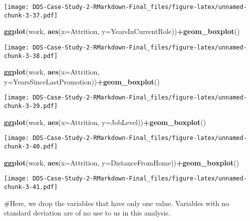 \documentclass[]{article}
\newenvironment{Shaded}{\begin{snugshade}}{\end{snugshade}}
\newcommand{\DataTypeTok}[1]{\textcolor[rgb]{0.13,0.29,0.53}{#1}}
\newcommand{\KeywordTok}[1]{\textcolor[rgb]{0.13,0.29,0.53}{\textbf{#1}}}
\newcommand{\NormalTok}[1]{#1}
\newcommand{\OperatorTok}[1]{\textcolor[rgb]{0.81,0.36,0.00}{\textbf{#1}}}
\begin{document}
\texttt{[image: DDS-Case-Study-2-RMarkdown-Final\_files/figure-latex/unnamed-chunk-3-37.pdf]}

\begin{Shaded}
\begin{Highlighting}[]
\KeywordTok{ggplot}\NormalTok{(work, }\KeywordTok{aes}\NormalTok{(}\DataTypeTok{x=}\NormalTok{Attrition, }\DataTypeTok{y=}\NormalTok{YearsInCurrentRole))}\OperatorTok{+}\KeywordTok{geom_boxplot}\NormalTok{()}
\end{Highlighting}
\end{Shaded}

\texttt{[image: DDS-Case-Study-2-RMarkdown-Final\_files/figure-latex/unnamed-chunk-3-38.pdf]}

\begin{Shaded}
\begin{Highlighting}[]
\KeywordTok{ggplot}\NormalTok{(work, }\KeywordTok{aes}\NormalTok{(}\DataTypeTok{x=}\NormalTok{Attrition, }\DataTypeTok{y=}\NormalTok{YearsSinceLastPromotion))}\OperatorTok{+}\KeywordTok{geom_boxplot}\NormalTok{()}
\end{Highlighting}
\end{Shaded}

\texttt{[image: DDS-Case-Study-2-RMarkdown-Final\_files/figure-latex/unnamed-chunk-3-39.pdf]}

\begin{Shaded}
\begin{Highlighting}[]
\KeywordTok{ggplot}\NormalTok{(work, }\KeywordTok{aes}\NormalTok{(}\DataTypeTok{x=}\NormalTok{Attrition, }\DataTypeTok{y=}\NormalTok{JobLevel))}\OperatorTok{+}\KeywordTok{geom_boxplot}\NormalTok{()}
\end{Highlighting}
\end{Shaded}

\texttt{[image: DDS-Case-Study-2-RMarkdown-Final\_files/figure-latex/unnamed-chunk-3-40.pdf]}

\begin{Shaded}
\begin{Highlighting}[]
\KeywordTok{ggplot}\NormalTok{(work, }\KeywordTok{aes}\NormalTok{(}\DataTypeTok{x=}\NormalTok{Attrition, }\DataTypeTok{y=}\NormalTok{DistanceFromHome))}\OperatorTok{+}\KeywordTok{geom_boxplot}\NormalTok{()}
\end{Highlighting}
\end{Shaded}

\texttt{[image: DDS-Case-Study-2-RMarkdown-Final\_files/figure-latex/unnamed-chunk-3-41.pdf]}

\#Here, we drop the variables that have only one value. Variables with
no standard deviation are of no use to us in this analysis.
\end{document}
